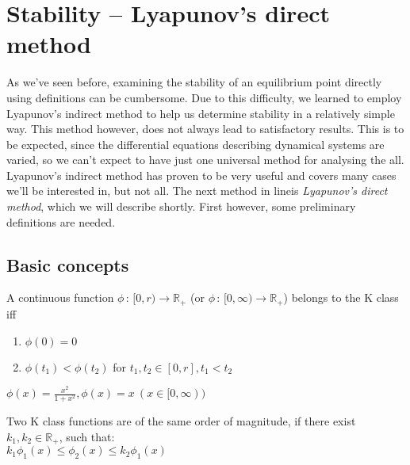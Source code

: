 
\chapter{Stability -- Lyapunov's direct method}
As we've seen before, examining the stability of an equilibrium point directly using definitions can be cumbersome.
Due to this difficulty, we learned to employ Lyapunov's indirect method to help us determine stability in a relatively simple way.
This method however, does not always lead to satisfactory results. This is to be expected, since the differential equations
describing dynamical systems are varied, so we can't expect to have just one universal method for analysing the all. Lyapunov's
indirect method has proven to be very useful and covers many cases we'll be interested in, but not all. The next method in lineis
\textit{Lyapunov's direct method}, which we will describe shortly. First however, some preliminary definitions are needed.
\section{Basic concepts}
{
    A continuous function $\phi \,:\,[0,r) \longrightarrow \mathbb{R}_+ $ (or $\phi \,:\,[0,\infty) \longrightarrow \mathbb{R}_+ $) belongs to the K class iff
        \begin{enumerate}
            \item $\phi (0) = 0$
            \item $\phi (t_1) <  \phi (t_2)$ for $t_1,t_2 \in [0,r], t_1<t_2$
        \end{enumerate}

    \ex{}
    {
        $\phi(x)  = \frac{x^2}{1+x^{2}}, \phi(x) = x \:(x\in [0,\infty))$
    }


}

{
    Two K class functions are of the same order of magnitude, if there exist $k_1,k_2\in \mathbb{R}_+$, such that:\\
    $k_1\phi_1(x) \le \phi_2(x) \le k_2\phi_1(x)$
}

